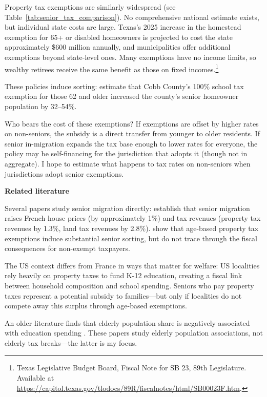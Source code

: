 \documentclass[11pt]{article}
\begin{document}
    Property tax exemptions are similarly widespread (see Table~\ref{tab:senior_tax_comparison}). No comprehensive national estimate exists, but individual state costs are large. Texas's 2025 increase in the homestead exemption for 65+ or disabled homeowners is projected to cost the state approximately \$600 million annually, and municipalities offer additional exemptions beyond state-level ones. Many exemptions have no income limits, so wealthy retirees receive the same benefit as those on fixed incomes.\footnote{Texas Legislative Budget Board, Fiscal Note for SB 23, 89th Legislature. Available at \url{https://capitol.texas.gov/tlodocs/89R/fiscalnotes/html/SB00023F.htm}.}

    These policies induce sorting: \cite{banzhaf2021age} estimate that Cobb County's 100\% school tax exemption for those 62 and older increased the county's senior homeowner population by 32--54\%.

    Who bears the cost of these exemptions? If exemptions are offset by higher rates on non-seniors, the subsidy is a direct transfer from younger to older residents. If senior in-migration expands the tax base enough to lower rates for everyone, the policy may be self-financing for the jurisdiction that adopts it (though not in aggregate). I hope to estimate what happens to tax rates on non-seniors when jurisdictions adopt senior exemptions.

     \textbf{Related literature}
    
    
    Several papers study senior migration directly: \citet{BadillaMarotoFaberLevyMunoz2024} establish that senior migration raises French house prices (by approximately 1\%) and tax revenues (property tax revenues by 1.3\%, land tax revenues by 2.8\%). \citet{banzhaf2021age} show that age-based property tax exemptions induce substantial senior sorting, but do not trace through the fiscal consequences for non-exempt taxpayers. 


    The US context differs from France in ways that matter for welfare: US localities rely heavily on property taxes to fund K-12 education, creating a fiscal link between household composition and school spending. Seniors who pay property taxes represent a potential subsidy to families---but only if localities do not compete away this surplus through age-based exemptions.

    An older literature finds that elderly population share is negatively associated with education spending \citep{Poterba1997, LaddMurray2001, HarrisEvansSchwab2001}. These papers study elderly population associations, not elderly tax breaks—the latter is my focus.
\end{document}
